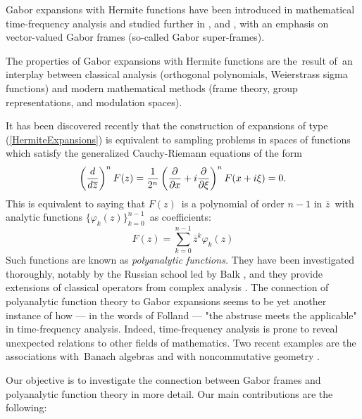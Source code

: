 \documentclass[12pt]{amsart}
\theoremstyle{plain}
\numberwithin{equation}{section}
\begin{document}
Gabor expansions with Hermite functions 
have been introduced in mathematical time-frequency analysis \cite%
{CharlyYura} and studied further in \cite{Fuhr}, \cite{CharlyYurasuper} and 
\cite{Abreusampling}, with an emphasis on vector-valued Gabor frames
(so-called Gabor super-frames).

The properties of Gabor expansions with Hermite functions are the\ result
of\ an interplay between classical analysis (orthogonal polynomials,
Weierstrass sigma functions) and modern mathematical methods (frame theory,
group representations, and modulation spaces).

It has been discovered recently \cite{Abreusampling} that the construction
of expansions of type (\ref{HermiteExpansions}) is equivalent to sampling
problems in spaces of functions which satisfy the generalized Cauchy-Riemann
equations of the form%
\begin{equation}
\left( \frac{d}{d\overline{z}}\right) ^{n}F(z)=\frac{1}{2^{n}}\left( \frac{%
\partial }{\partial x}+i\frac{\partial }{\partial \xi }\right) ^{n}F(x+i\xi
)=0\text{.}  \label{eq:c1}
\end{equation}%
This is equivalent to saying that $F(z)$\ is a polynomial of order $n-1$ in $%
\overline{z}$\ with analytic functions $\{\varphi _{k}(z)\}_{k=0}^{n-1}$\ as
coefficients:%
\begin{equation}
F(z)=\sum_{k=0}^{n-1}\overline{z}^{k}\varphi _{k}(z)  \label{polypolynomial}
\end{equation}%
Such functions are known as \emph{polyanalytic functions. }They have been
investigated thoroughly, notably by the Russian school led by Balk \cite%
{Balk}, and they provide extensions of classical operators from complex
analysis \cite{BegehrHille}. The connection of polyanalytic function theory
to Gabor expansions seems to be yet another instance of how --- in the words
of Folland \cite{Folland} --- "the abstruse meets the applicable" in
time-frequency analysis. Indeed, time-frequency analysis is prone to reveal
unexpected relations to other fields of mathematics. Two recent examples are
the associations with\ Banach algebras \cite{GL} and with noncommutative
geometry \cite{Luef}.

Our objective is to investigate the connection between Gabor frames and
polyanalytic function theory in more detail. Our main contributions are the
following:%
\end{document}
